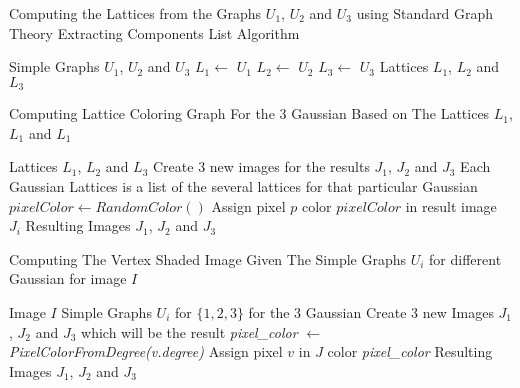 \documentclass{article}
\begin{document}
\begin{algorithm}
\caption{Computing the Lattices from the Graphs $U_1$, $U_2$ and $U_3$ using Standard Graph Theory Extracting Components List Algorithm}
    \begin{algorithmic}
    \REQUIRE Simple Graphs $U_1$, $U_2$ and $U_3$
    \STATE $L_1 \gets$   $U_1$
    \STATE $L_2 \gets$   $U_2$
    \STATE $L_3 \gets$   $U_3$
    \RETURN Lattices $L_1$, $L_2$ and $L_3$
    \end{algorithmic}
\end{algorithm}

\begin{algorithm}
\caption{Computing Lattice Coloring Graph For the 3 Gaussian Based on The Lattices $L_1$, $L_1$ and $L_1$}
    \begin{algorithmic}
        \REQUIRE Lattices $L_1$, $L_2$ and $L_3$
        \STATE Create 3 new images for the results $J_1$, $J_2$ and $J_3$
            \STATE Each Gaussian Lattices is a list of the several lattices for that particular Gaussian
                \STATE {}
                \STATE $pixelColor \gets Random Color()$
                    \STATE Assign pixel $p$ color $pixelColor$ in result image $J_i$
                \ENDFOR
            \ENDFOR
        \ENDFOR
        \RETURN Resulting Images $J_1$, $J_2$ and $J_3$
    \end{algorithmic}
\end{algorithm}

\begin{algorithm}
\caption{Computing The Vertex Shaded Image Given The Simple Graphs $U_i$ for different Gaussian for image $I$}
    \begin{algorithmic}
        \REQUIRE Image $I$
        \REQUIRE Simple Graphs $U_i$ for $\{1, 2, 3\}$ for the 3 Gaussian
        \STATE Create 3 new Images $J_1$, $J_2$ and $J_3$ which will be the result
                \STATE \textit{pixel\_color} $\gets$ \textit{PixelColorFromDegree(v.degree)}
                \STATE Assign pixel $v$ in $J$ color \textit{pixel\_color}
            \ENDFOR
        \ENDFOR
        \RETURN Resulting Images $J_1$, $J_2$ and $J_3$
    \end{algorithmic}
\end{algorithm}
\end{document}
